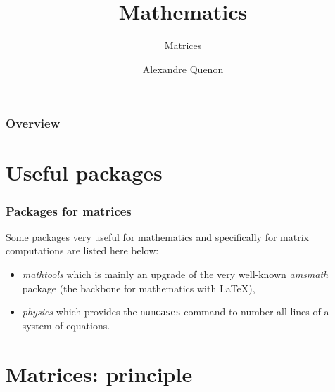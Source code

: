 \documentclass[11pt]{beamer}
\title{Mathematics}
\subtitle{Matrices}
\author[A. Quenon]{Alexandre Quenon}
\begin{document}
\begin{frame}
	\titlepage
\end{frame}


\begin{frame}
	\frametitle{Overview}
	
	\tableofcontents
\end{frame}


\section{Useful packages}

\begin{frame}
	\frametitle{Packages for matrices}

	Some packages very useful for mathematics and specifically for matrix computations are listed here below:
	\begin{itemize}
		\item \emph{mathtools} which is mainly an upgrade of the very well-known \emph{amsmath} package (the backbone for mathematics with \LaTeX{}),
		\item \emph{physics} which provides the \texttt{numcases} command to number all lines of a system of equations.
	\end{itemize}
\end{frame}


\section{Matrices: principle}
\end{document}
